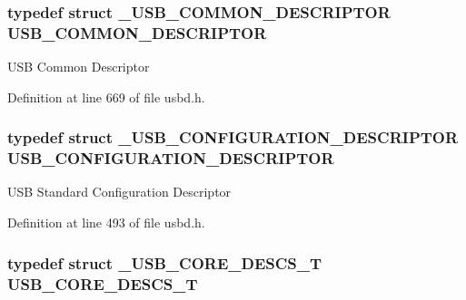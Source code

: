 \subsubsection[{\texorpdfstring{U\+S\+B\+\_\+\+C\+O\+M\+M\+O\+N\+\_\+\+D\+E\+S\+C\+R\+I\+P\+T\+OR}{USB_COMMON_DESCRIPTOR}}]{\setlength{\rightskip}{0pt plus 5cm}typedef struct {\bf \+\_\+\+U\+S\+B\+\_\+\+C\+O\+M\+M\+O\+N\+\_\+\+D\+E\+S\+C\+R\+I\+P\+T\+OR} {\bf U\+S\+B\+\_\+\+C\+O\+M\+M\+O\+N\+\_\+\+D\+E\+S\+C\+R\+I\+P\+T\+OR}}\hypertarget{group__USBD__Core_gae20aa0e1d1e5418dbef678b53b2c3ebe}{}\label{group__USBD__Core_gae20aa0e1d1e5418dbef678b53b2c3ebe}
U\+SB Common Descriptor 

Definition at line 669 of file usbd.\+h.

\subsubsection[{\texorpdfstring{U\+S\+B\+\_\+\+C\+O\+N\+F\+I\+G\+U\+R\+A\+T\+I\+O\+N\+\_\+\+D\+E\+S\+C\+R\+I\+P\+T\+OR}{USB_CONFIGURATION_DESCRIPTOR}}]{\setlength{\rightskip}{0pt plus 5cm}typedef struct {\bf \+\_\+\+U\+S\+B\+\_\+\+C\+O\+N\+F\+I\+G\+U\+R\+A\+T\+I\+O\+N\+\_\+\+D\+E\+S\+C\+R\+I\+P\+T\+OR} {\bf U\+S\+B\+\_\+\+C\+O\+N\+F\+I\+G\+U\+R\+A\+T\+I\+O\+N\+\_\+\+D\+E\+S\+C\+R\+I\+P\+T\+OR}}\hypertarget{group__USBD__Core_ga196f799666c475a9064909c6e72b9d72}{}\label{group__USBD__Core_ga196f799666c475a9064909c6e72b9d72}
U\+SB Standard Configuration Descriptor 

Definition at line 493 of file usbd.\+h.

\subsubsection[{\texorpdfstring{U\+S\+B\+\_\+\+C\+O\+R\+E\+\_\+\+D\+E\+S\+C\+S\+\_\+T}{USB_CORE_DESCS_T}}]{\setlength{\rightskip}{0pt plus 5cm}typedef struct {\bf \+\_\+\+U\+S\+B\+\_\+\+C\+O\+R\+E\+\_\+\+D\+E\+S\+C\+S\+\_\+T}  {\bf U\+S\+B\+\_\+\+C\+O\+R\+E\+\_\+\+D\+E\+S\+C\+S\+\_\+T}}\hypertarget{group__USBD__Core_gabdc617d119eac0555f91bea957c41ecc}{}\label{group__USBD__Core_gabdc617d119eac0555f91bea957c41ecc}


